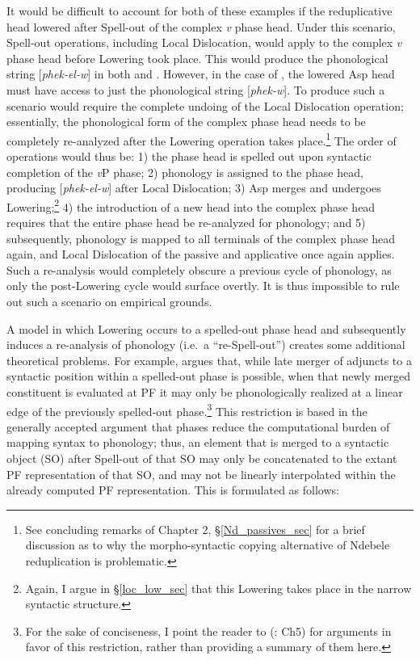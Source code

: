 It would be difficult to account for both of these examples if the reduplicative head lowered after Spell-out of the complex {\it v} phase head. Under this scenario, Spell-out operations, including Local Dislocation, would apply to the complex {\it v} phase head before Lowering took place. This would produce the phonological string [{\it phek-el-w}] in both \LLast and \Last. However, in the case of \LLast, the lowered Asp head must have access to just the phonological string [{\it phek-w}]. To produce such a scenario would require the complete undoing of the Local Dislocation operation; essentially, the phonological form of the complex phase head needs to be completely re-analyzed after the Lowering operation takes place.\footnote{See concluding remarks of Chapter 2, \S\ref{Nd_passives_sec} for a brief discussion as to why the morpho-syntactic copying alternative of Ndebele reduplication is problematic.} The order of operations would thus be: 1) the phase head is spelled out upon syntactic completion of the {\it v}P phase; 2) phonology is assigned to the phase head, producing [{\it phek-el-w}] after Local Dislocation; 3) Asp merges and undergoes Lowering;\footnote{Again, I argue in \S\ref{loc_low_sec} that this Lowering takes place in the narrow syntactic structure.} 4) the introduction of a new head into the complex phase head requires that the entire phase head be re-analyzed for phonology; and 5) subsequently, phonology is mapped to all terminals of the complex phase head again, and Local Dislocation of the passive and applicative once again applies. Such a re-analysis would completely obscure a previous cycle of phonology, as only the post-Lowering cycle would surface overtly. It is thus impossible to rule out such a scenario on empirical grounds.

A model in which Lowering occurs to a spelled-out phase head and subsequently induces a re-analysis of phonology (i.e.\ a ``re-Spell-out'') creates some additional theoretical problems. For example, \citet{nissenbaum2000} argues that, while late merger of adjuncts to a syntactic position within a spelled-out phase is possible, when that newly merged constituent is evaluated at PF it may only be phonologically realized at a linear edge of the previously spelled-out phase.\footnote{For the sake of conciseness, I point the reader to \citeauthor{nissenbaum2000} (\citeyear{nissenbaum2000}: Ch5) for arguments in favor of this restriction, rather than providing a summary of them here.} This restriction is based in the generally accepted argument that phases reduce the computational burden of mapping syntax to phonology; thus, an element that is merged to a syntactic object (SO) after Spell-out of that SO may only be concatenated to the extant PF representation of that SO, and may not be linearly interpolated within the already computed PF representation. This is formulated as follows:

